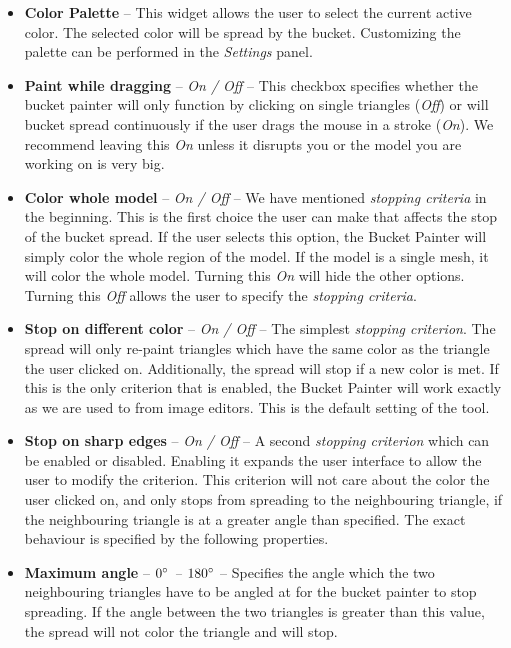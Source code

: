 \begin{itemize}
\item \textbf{Color Palette} -- This widget allows the user to select the current active color. The selected color will be spread by the bucket. Customizing the palette can be performed in the \textit{Settings} panel.

\item \textbf{Paint while dragging} -- \textit{On / Off} -- This checkbox specifies whether the bucket painter will only function by clicking on single triangles (\textit{Off}) or will bucket spread continuously if the user drags the mouse in a stroke (\textit{On}). We recommend leaving this \textit{On} unless it disrupts you or the model you are working on is very big.

\item \textbf{Color whole model} -- \textit{On / Off} -- We have mentioned \textit{stopping criteria} in the beginning. This is the  first choice the user can make that affects the stop of the bucket spread. If the user selects this option, the Bucket Painter will simply color the whole region of the model. If the model is a single mesh, it will color the whole model. Turning this \textit{On} will hide the other options. Turning this \textit{Off} allows the user to specify the \textit{stopping criteria}.

\item \textbf{Stop on different color} -- \textit{On / Off} -- The simplest \textit{stopping criterion}. The spread will only re-paint triangles which have the same color as the triangle the user clicked on. Additionally, the spread will stop if a new color is met. If this is the only criterion that is enabled, the Bucket Painter will work exactly as we are used to from image editors. This is the default setting of the tool.

\item \textbf{Stop on sharp edges} -- \textit{On / Off} -- A second \textit{stopping criterion} which can be enabled or disabled. Enabling it expands the user interface to allow the user to modify the criterion. This criterion will not care about the color the user clicked on, and only stops from spreading to the neighbouring triangle, if the neighbouring triangle is at a greater angle than specified. The exact behaviour is specified by the following properties.

\item \textbf{Maximum angle} -- \textit{$0\degree$ -- $180\degree$} -- Specifies the angle which the two neighbouring triangles have to be angled at for the bucket painter to stop spreading. If the angle between the two triangles is greater than this value, the spread will not color the triangle and will stop.


\end{itemize}
